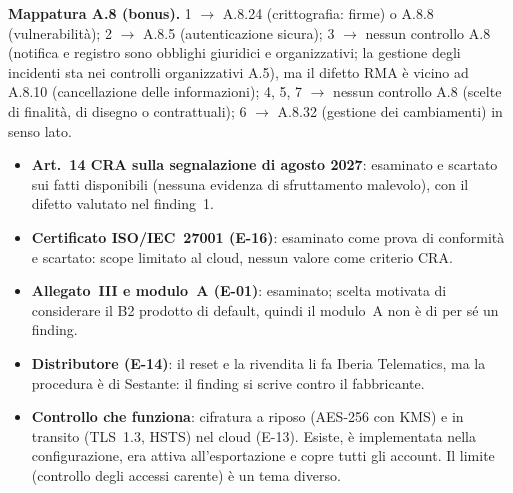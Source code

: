 \begin{integrazione}
\medskip\noindent\textbf{Mappatura A.8 (bonus).} 1 $\to$ A.8.24 (crittografia: firme) o A.8.8
(vulnerabilità); 2 $\to$ A.8.5 (autenticazione sicura); 3 $\to$ nessun controllo A.8 (notifica e
registro sono obblighi giuridici e organizzativi; la gestione degli incidenti sta nei controlli
organizzativi A.5), ma il difetto RMA è vicino ad A.8.10 (cancellazione delle informazioni); 4, 5,
7 $\to$ nessun controllo A.8 (scelte di finalità, di disegno o contrattuali); 6 $\to$ A.8.32 (gestione
dei cambiamenti) in senso lato.
\end{integrazione}

\begin{integrazione}
\begin{itemize}
  \item \textbf{Art.~14 CRA sulla segnalazione di agosto 2027}: esaminato e scartato sui fatti
    disponibili (nessuna evidenza di sfruttamento malevolo), con il difetto valutato nel finding~1.
  \item \textbf{Certificato ISO/IEC~27001 (E-16)}: esaminato come prova di conformità e scartato:
    scope limitato al cloud, nessun valore come criterio CRA.
  \item \textbf{Allegato~III e modulo~A (E-01)}: esaminato; scelta motivata di considerare il B2
    prodotto di default, quindi il modulo~A non è di per sé un finding.
  \item \textbf{Distributore (E-14)}: il reset e la rivendita li fa Iberia Telematics, ma la procedura
    è di Sestante: il finding si scrive contro il fabbricante.
  \item \textbf{Controllo che funziona}: cifratura a riposo (AES-256 con KMS) e in transito (TLS~1.3,
    HSTS) nel cloud (E-13). Esiste, è implementata nella configurazione, era attiva all'esportazione
    e copre tutti gli account. Il limite (controllo degli accessi carente) è un tema diverso.
\end{itemize}
\end{integrazione}

